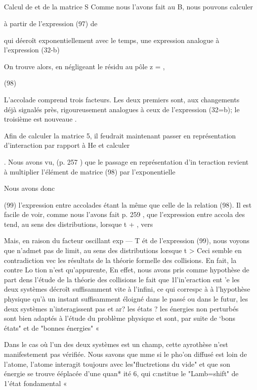\subsection{} Calcul de  et de la matrice S%
Comme nous l'avons fait au  B, nous pouvons calculer

à partir de l'expression (97) de

qui déeroît exponentiellement avec le temps, une expression analogue à l'expression (32-b)

On trouve alors, en négligeant le résidu au pôle z = ,


(98)

L'accolade comprend trois facteurs. Les deux premiers sont, aux changements
déjà signalés près, rigoureusement analogues à ceux de l'expression (32=b);
le troisième est nouveaue .

Afin de calculer la matrice 5, il feudrait maintenant passer en
représentation d'interaction par rapport à He et calculer

.
Nous avons vu, (p. 257 ) que le passage en représentation d'in
teraction revient à multiplier l'élément de matrice (98) par l'exponentielle

Nous avons donc



(99)
l'expression entre accolades étant la même que celle de la relation (98). Il est
facile de voir, comme nous l'avons fait p. 259 , que l'expression entre accola
des tend, au sens des distributions, lorsque t +  , vers


Mais, en raison du facteur oscillant exp — T ét de l'expression (99), nous voyons que  n'admet pas de limit,
au sens des distributions lorsque t >  Ceci semble en contradiction vec
les résultats de la théorie formelle des collisions. En fait, la contre Lo
tion n'est qu'appurente, En effet, nous avons pris comme hypothèse de  part
dens l'étude de la théorie des collisions le fait que 1l'in’eraction ent 'e
les deux systèmes décroît suffisamment vite à l'infini, ce qui correspc à à
l'hypothèse physique qu'à un instant suffisamment éloigné dans le passé ou
dans le futur, les deux systèmes n'interagissent pas et ar? les états ?
les énergies non perturbés sont bien adaptés à l'étude du problème physique
et sont, par suite de ‘bons états" et de "bonnes énergies" «

Dans le cas où l'un des deux systèmes est un champ, cette ayrothèse n'est manifestement pas vérifiée. Nous savons que mme si le pho’on
diffusé est loin de l’atome, l'atome interagit toujours avec les"fluctretions
du vide" et que son énergie se trouve ééplacée d'une quan* ité 6, qui c:nstitue
le "Lamb=shift" de 1'état fondamental «

